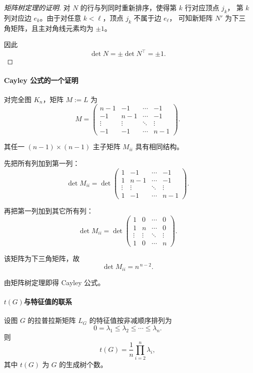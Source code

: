 \documentclass[lang=cn,newtx,10pt,scheme=chinese,chinesefont=nofont,citestyle=gb7714-2015, bibstyle=gb7714-2015]{elegantbook}
\begin{document}
\begin{refsection}
\begin{proof}[ 矩阵树定理的证明]
对 $N$ 的行与列同时重新排序，使得第 $k$ 行对应顶点 $j_k$，
第 $k$ 列对应边 $e_k$。由于对任意 $k<\ell$，顶点 $j_k$ 不属于边 $e_\ell$，
可知新矩阵 $N'$ 为下三角矩阵，且主对角线元素均为 $\pm 1$。

因此
\[
\det N = \pm \det N^\top = \pm 1.
\]
\end{proof}

\paragraph{Cayley 公式的一个证明}

对完全图 $K_n$，矩阵 $M:=L$ 为
\[
M=\begin{pmatrix}
n-1 & -1 & \cdots & -1\\
-1 & n-1 & \cdots & -1\\
\vdots & \vdots & \ddots & \vdots\\
-1 & -1 & \cdots & n-1
\end{pmatrix}.
\]

其任一 $(n-1)\times(n-1)$ 主子矩阵 $M_{ii}$ 具有相同结构。

先把所有列加到第一列：
\[
\det M_{ii}
=\det
\begin{pmatrix}
1 & -1 & \cdots & -1\\
1 & n-1 & \cdots & -1\\
\vdots & \vdots & \ddots & \vdots\\
1 & -1 & \cdots & n-1
\end{pmatrix}.
\]

再把第一列加到其它所有列：
\[
\det M_{ii}
=\det
\begin{pmatrix}
1 & 0 & \cdots & 0\\
1 & n & \cdots & 0\\
\vdots & \vdots & \ddots & \vdots\\
1 & 0 & \cdots & n
\end{pmatrix}.
\]

该矩阵为下三角矩阵，故
\[
\det M_{ii}=n^{\,n-2}.
\]

由矩阵树定理即得 Cayley 公式。

\paragraph{$t(G)$与特征值的联系}
\begin{theorem}\label{thm:laplacian-tree}
设图 $G$ 的拉普拉斯矩阵 $L_G$ 的特征值按非减顺序排列为
\[
0=\lambda_1 \le \lambda_2 \le \cdots \le \lambda_n.
\]
则
\[
t(G)=\frac{1}{n}\prod_{i=2}^n \lambda_i,
\]
其中 $t(G)$ 为 $G$ 的生成树个数。
\end{theorem}


\end{refsection}
\end{document}
